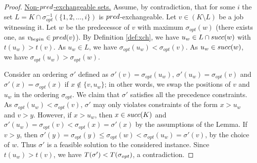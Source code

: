 \documentclass{article}
\theoremstyle{definition}
\begin{document}
\begin{proof}
{\underline{Non-${pred}$-exchangeable sets.}} Assume, by contradiction, that for some $i$ the set $L = K \cap \sigma_{opt}^{-1}(\{1,2,\ldots,i\})$ is ${pred}$-exchangeable.
Let $v \in (K \setminus L)$ be a job witnessing it. Let $w$ be the predecessor of $v$ with maximum $\sigma_{opt}(w)$
(there exists one, as $v_{begin} \in {\ensuremath{pred}}(v)$). 
By Definition \ref{def:xch}, we have $u_w \in L \cap {\ensuremath{succ}}(w)$ with $t(u_w) > t(v)$.
As $u_w \in L$, we have $\sigma_{opt}(u_w) < \sigma_{opt}(v)$. As $u_w \in {\ensuremath{succ}}(w)$, we have $\sigma_{opt}(u_w) > \sigma_{opt}(w)$.

Consider an ordering $\sigma'$ defined as $\sigma'(v) = \sigma_{opt}(u_w)$, $\sigma'(u_w) = \sigma_{opt}(v)$ and $\sigma'(x) = \sigma_{opt}(x)$ if $x \notin \{v,u_w\}$;
in other words, we swap the positions of $v$ and $u_w$ in the ordering $\sigma_{opt}$. We claim that $\sigma'$ satisfies all the precedence constraints.
As $\sigma_{opt}(u_w) < \sigma_{opt}(v)$, $\sigma'$ may only violates constraints of the form $x > u_w$ and $v > y$. However, if $x > u_w$, then $x \in {\ensuremath{succ}}(K)$
and $\sigma'(u_w) = \sigma_{opt}(v) < \sigma_{opt}(x) = \sigma'(x)$ by the assumptions of the Lemma.
If $v > y$, then $\sigma'(y) = \sigma_{opt}(y) \leq \sigma_{opt}(w) < \sigma_{opt}(u_w) = \sigma'(v)$, by the choice of $w$.
Thus $\sigma'$ is a feasible solution to the considered \schedname{} instance. Since $t(u_w) > t(v)$, we have $T(\sigma') < T(\sigma_{opt})$, a contradiction.
\end{proof}
\end{document}
